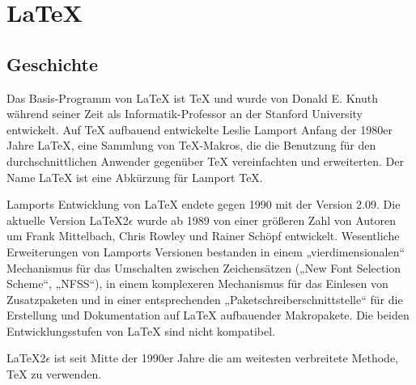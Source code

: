 \chapter{\LaTeX}
\section{Geschichte}

Das Basis-Programm von LaTeX ist TeX und wurde von Donald E. Knuth während seiner Zeit als Informatik-Professor an der Stanford University entwickelt. Auf TeX aufbauend entwickelte Leslie Lamport Anfang der 1980er Jahre\cite{Lamport} LaTeX, eine Sammlung von TeX-Makros, die die Benutzung für den durchschnittlichen Anwender gegenüber TeX vereinfachten und erweiterten. Der Name LaTeX ist eine Abkürzung für Lamport TeX.

Lamports Entwicklung von LaTeX endete gegen 1990 mit der Version 2.09.\cite{readme} Die aktuelle Version \LaTeX 2$\epsilon$ wurde ab 1989 von einer größeren Zahl von Autoren um Frank Mittelbach, Chris Rowley und Rainer Schöpf entwickelt.\cite{Mittelbach2010} Wesentliche Erweiterungen von Lamports Versionen bestanden in einem „vierdimensionalen“ Mechanismus für das Umschalten zwischen Zeichensätzen („New Font Selection Scheme“, „NFSS“), in einem komplexeren Mechanismus für das Einlesen von Zusatzpaketen und in einer entsprechenden „Paketschreiberschnittstelle“ für die Erstellung und Dokumentation auf LaTeX aufbauender Makropakete.\cite{usrguide} Die beiden Entwicklungsstufen von LaTeX sind nicht kompatibel.

\LaTeX 2$\epsilon$ ist seit Mitte der 1990er Jahre die am weitesten verbreitete Methode, TeX zu verwenden.